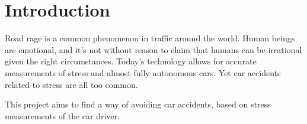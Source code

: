 \section{Introduction}\label{sec:introduction}

Road rage is a common phenomenon in traffic around the world. Human beings
are emotional, and it's not without reason to claim that humans can be
irrational given the right circumstances. Today's technology allows for
accurate measurements of stress and almost fully autonomous cars. Yet car
accidents related to stress are all too common.

This project aims to find a way of avoiding car accidents, based on stress
measurements of the car driver.
